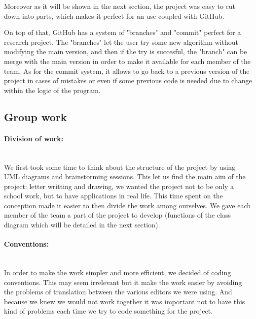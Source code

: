 Moreover as it will be shown in the next section, the project was easy to cut down into parts, which makes it perfect for an use coupled with GitHub.

On top of that, GitHub has a system of "branches" and "commit" perfect for a research project. The "branches" let the user try some new algorithm without modifying the main version, and then if the try is succesful, the "branch" can be merge with the main version in order to make it available for each member of the team. As for the commit system, it allows to go back to a previous version of the project in cases of mistakes or even if some previous code is needed due to change within the logic of the program.

\subsection{Group work}

\paragraph{Division of work: \\\\}
We first took some time to think about the structure of the project by using UML diagrams and brainstorming sessions. This let us find the main aim of the project: letter writting and drawing, we wanted the project not to be only a school work, but to have applications in real life. This time spent on the conception made it easier to then divide the work among ourselves. We gave each member of the team a part of the project to develop (functions of the class diagram which will be detailed in the next section).

\paragraph{Conventions: \\\\}

In order to make the work simpler and more efficient, we decided of coding conventions. This may seem irrelevant but it make the work easier by avoiding the problems of translation between the various editors we were using. And because we knew we would not work together it was important not to have this kind of problems each time we try to code something for the project.

